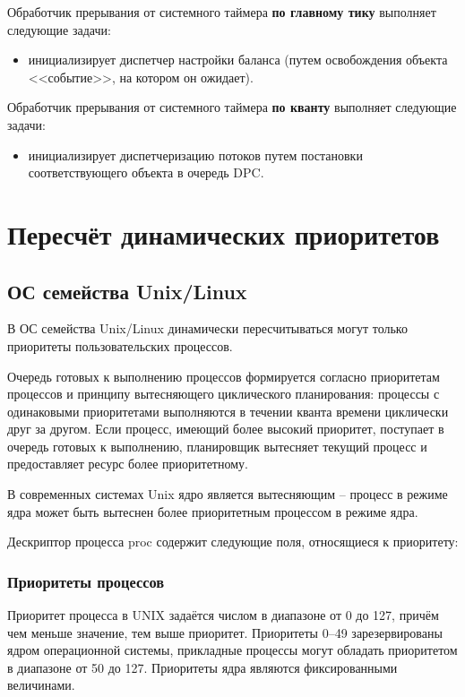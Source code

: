 Обработчик прерывания от системного таймера \textbf{по главному тику} выполняет следующие задачи:
\begin{itemize}
	\item инициализирует диспетчер настройки баланса (путем освобождения объекта <<событие>>, на котором он ожидает).
\end{itemize}

Обработчик прерывания от системного таймера \textbf{по кванту} выполняет следующие задачи:
\begin{itemize}
	\item инициализирует диспетчеризацию потоков путем постановки соответствующего объекта в очередь {\ttfamily DPC}.
\end{itemize}

\chapter{Пересчёт динамических приоритетов}

\section{ОС семейства Unix/Linux}

В ОС семейства {\ttfamily Unix/Linux} динамически пересчитываться могут только приоритеты пользовательских процессов.

Очередь готовых к выполнению процессов формируется согласно приоритетам процессов и принципу вытесняющего циклического планирования: процессы с одинаковыми приоритетами выполняются в течении кванта времени циклически друг за другом. Если процесс, имеющий более высокий приоритет, поступает в очередь готовых к выполнению, планировщик вытесняет текущий процесс и предоставляет ресурс более приоритетному. 

В современных системах {\ttfamily Unix} ядро является вытесняющим – процесс в режиме ядра может быть вытеснен более приоритетным процессом в режиме ядра.

 

Дескриптор процесса proc содержит следующие поля, относящиеся к приоритету:

\subsection{Приоритеты процессов}

Приоритет процесса в {\ttfamily UNIX} задаётся числом в диапазоне от 0 до 127, причём чем меньше значение, тем выше приоритет. Приоритеты 0--49 зарезервированы ядром операционной системы, прикладные процессы могут обладать приоритетом в диапазоне от 50 до 127. Приоритеты ядра являются фиксированными величинами.

